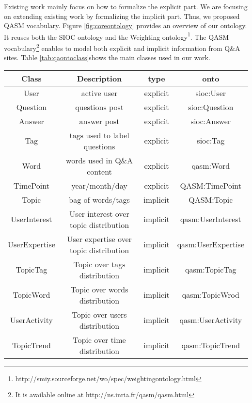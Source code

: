 Existing work mainly focus on how to formalize the explicit part. We are focusing on extending existing work by formalizing the implicit part. Thus, we proposed QASM vocabulary. Figure \ref{fig:coreontology} provides an overview of our ontology. It reuses both the SIOC ontology and the Weighting ontology\footnote{http://smiy.sourceforge.net/wo/spec/weightingontology.html}.
The QASM vocabulary\footnote{It is available online at http://ns.inria.fr/qasm/qasm.html} enables to model both explicit and implicit information from Q\&A sites. Table \ref{tab:qaontoclass}shows the main classes used in our work.


\begin{sidewaystable}
    \centering
    \begin{tabular}{c|c|c|c}
    \hline
    Class &  Description & type & onto \\ \hline
    User  & active user & explicit &  sioc:User \\ \hline
    Question & questions post & explicit & sioc:Question \\ \hline
    Answer  & answer post & explicit & sioc:Answer \\ \hline
    Tag & tags used to label questions & explicit & sioc:Tag \\ \hline
    Word & words used in Q\&A content & explicit & qasm:Word \\ \hline
    TimePoint & year/month/day & explicit & QASM:TimePoint \\ \hline
    Topic & bag of words/tags & implicit & QASM:Topic \\ \hline   
    UserInterest& User interest over topic distribution & implicit& qasm:UserInterest\\ \hline
    UserExpertise & User expertise over topic distribution &implicit& qasm:UserExpertise \\ \hline
    TopicTag &Topic over tags distribution&implicit &qasm:TopicTag \\ \hline
    
    TopicWord&Topic over words distribution &implicit & qasm:TopicWrod\\ \hline
    
    UserActivity&Topic over users distribution & implicit &qasm:UserActivity \\ \hline
    
    TopicTrend &Topic over time distribution &implicit & qasm:TopicTrend\\ \hline
          
    \end{tabular}
    \caption{the Vocabulary (class) used in our work}
    \label{tab:qaontoclass}
\end{sidewaystable}


